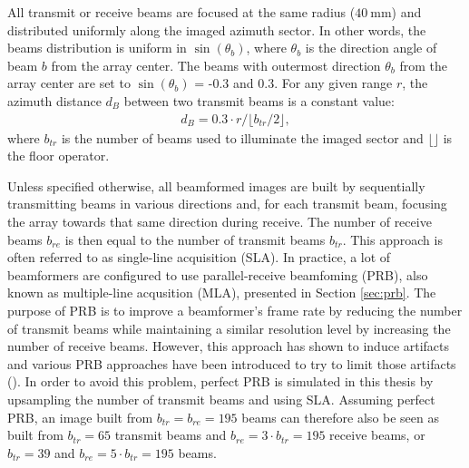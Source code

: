 All transmit or receive beams are focused at the same radius ($40~$mm) and distributed uniformly along the imaged azimuth sector. In other words, the beams distribution is uniform in $\sin(\theta_b)$, where $\theta_b$ is the direction angle of beam $b$ from the array center.
The beams with outermost direction $\theta_b$ from the array center are set to $\sin(\theta_b)$ = -0.3 and 0.3.
For any given range $r$, the azimuth distance $d_B$ between two transmit beams is a constant value:
\begin{align}
    d_B = 0.3 \cdot r / \lfloor b_{tr} / 2 \rfloor,
\label{eq:dist_beams}
\end{align}
\noindent
where $b_{tr}$ is the number of beams used to illuminate the imaged sector and $\lfloor \rfloor$ is the floor operator.

Unless specified otherwise, all beamformed images are built by sequentially transmitting beams in various directions and, for each transmit beam, focusing the array towards that same direction during receive. The number of receive beams $b_{re}$ is then equal to the number of transmit beams $b_{tr}$. This approach is often referred to as single-line acquisition (SLA).
In practice, a lot of beamformers are configured to use parallel-receive beamfoming (PRB), also known as multiple-line acqusition (MLA), presented in Section \ref{sec:prb}. The purpose of PRB is to improve a beamformer's frame rate by reducing the number of transmit beams while maintaining a similar resolution level by increasing the number of receive beams.
However, this approach has shown to induce artifacts and various PRB approaches have been introduced to try to limit those artifacts (\cite{multiline}).
In order to avoid this problem, perfect PRB is simulated in this thesis by upsampling the number of transmit beams and using SLA. Assuming perfect PRB, an image built from $b_{tr} = b_{re} = 195$ beams can therefore also be seen as built from $b_{tr} = 65$ transmit beams and $b_{re} = 3 \cdot b_{tr} = 195$ receive beams, or $b_{tr} = 39$ and $b_{re} = 5 \cdot b_{tr} = 195$ beams.

